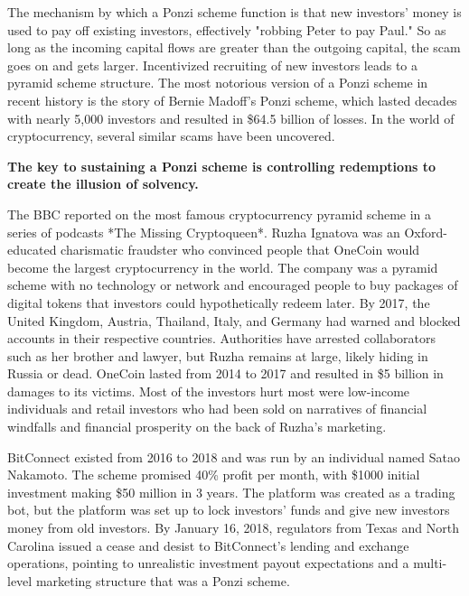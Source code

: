 The mechanism by which a Ponzi scheme function is that new investors' money is
used to pay off existing investors, effectively "robbing Peter to pay Paul." So
as long as the incoming capital flows are greater than the outgoing capital, the
scam goes on and gets larger. Incentivized recruiting of new investors leads to
a pyramid scheme structure. The most notorious version of a Ponzi scheme in
recent history is the story of Bernie Madoff's Ponzi scheme, which lasted
decades with nearly 5,000 investors and resulted in \$64.5 billion of losses. In
the world of cryptocurrency, several similar scams have been uncovered.
\cite{zuckoff_ponzis_2005}

\begin{infobox}
 \textbf{The key to sustaining a Ponzi scheme is controlling redemptions to
  create the illusion of solvency.}
\end{infobox}


The BBC reported on the most famous cryptocurrency pyramid scheme in a series of
podcasts *The Missing Cryptoqueen*. Ruzha Ignatova was an Oxford-educated
charismatic fraudster who convinced people that OneCoin would become the largest
cryptocurrency in the world. The company was a pyramid scheme with no technology
or network and encouraged people to buy packages of digital tokens that
investors could hypothetically redeem later. By 2017, the United Kingdom,
Austria, Thailand, Italy, and Germany had warned and blocked accounts in their
respective countries. Authorities have arrested collaborators such as her
brother and lawyer, but Ruzha remains at large, likely hiding in Russia or dead.
OneCoin lasted from 2014 to 2017 and resulted in \$5 billion in damages to its
victims. Most of the investors hurt most were low-income individuals and retail
investors who had been sold on narratives of financial windfalls and financial
prosperity on the back of Ruzha's marketing.


BitConnect existed from 2016 to 2018 and was run by an individual named Satao
Nakamoto. The scheme promised 40\% profit per month, with \$1000 initial
investment making \$50 million in 3 years. The platform was created as a trading
bot, but the platform was set up to lock investors' funds and give new investors
money from old investors. By January 16, 2018, regulators from Texas and North
Carolina issued a cease and desist to BitConnect's lending and exchange
operations, pointing to unrealistic investment payout expectations and a
multi-level marketing structure that was a Ponzi scheme.

